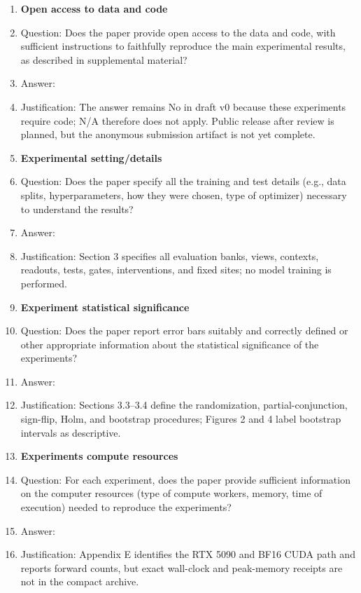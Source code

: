 \begin{enumerate}
\item {\bf Open access to data and code}
  \item[] Question: Does the paper provide open access to the data and code, with sufficient instructions to faithfully reproduce the main experimental results, as described in supplemental material?
  \item[] Answer: \answerNo{}
  \item[] Justification: The answer remains No in draft v0 because these experiments require code; N/A therefore does not apply. Public release after review is planned, but the anonymous submission artifact is not yet complete.

\item {\bf Experimental setting/details}
  \item[] Question: Does the paper specify all the training and test details (e.g., data splits, hyperparameters, how they were chosen, type of optimizer) necessary to understand the results?
  \item[] Answer: \answerYes{}
  \item[] Justification: Section 3 specifies all evaluation banks, views, contexts, readouts, tests, gates, interventions, and fixed sites; no model training is performed.

\item {\bf Experiment statistical significance}
  \item[] Question: Does the paper report error bars suitably and correctly defined or other appropriate information about the statistical significance of the experiments?
  \item[] Answer: \answerYes{}
  \item[] Justification: Sections 3.3--3.4 define the randomization, partial-conjunction, sign-flip, Holm, and bootstrap procedures; Figures 2 and 4 label bootstrap intervals as descriptive.

\item {\bf Experiments compute resources}
  \item[] Question: For each experiment, does the paper provide sufficient information on the computer resources (type of compute workers, memory, time of execution) needed to reproduce the experiments?
  \item[] Answer: \answerNo{}
  \item[] Justification: Appendix E identifies the RTX 5090 and BF16 CUDA path and reports forward counts, but exact wall-clock and peak-memory receipts are not in the compact archive.


\end{enumerate}
